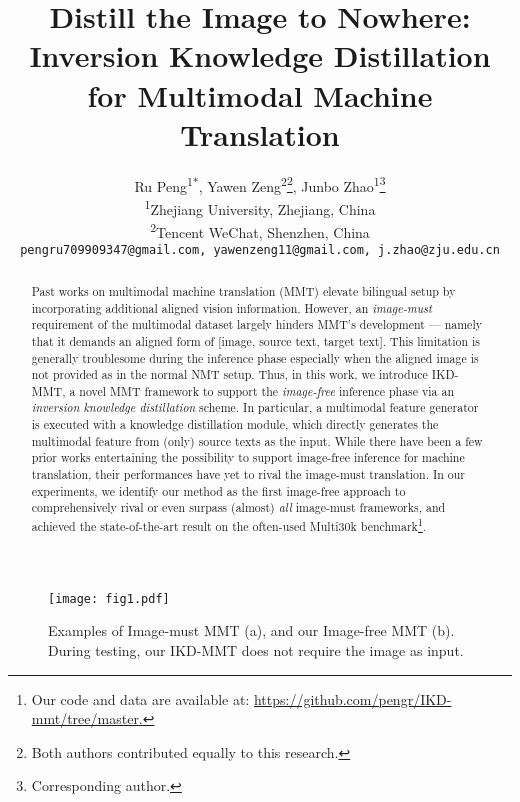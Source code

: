 \documentclass[11pt]{article}
\title{Distill the Image to Nowhere: Inversion Knowledge Distillation for Multimodal Machine Translation}
\author{Ru Peng\textsuperscript{1$\ast$}, Yawen Zeng\textsuperscript{2}\thanks{Both authors contributed equally to this research.}, Junbo Zhao\textsuperscript{1}\thanks{Corresponding author.} \\
  \textsuperscript{1}Zhejiang University, Zhejiang, China \\
  \textsuperscript{2}Tencent WeChat, Shenzhen, China \\
  \texttt{pengru709909347@gmail.com, yawenzeng11@gmail.com, j.zhao@zju.edu.cn}
}
\begin{document}
\maketitle
\begin{abstract}
Past works on multimodal machine translation (MMT) elevate bilingual setup by incorporating additional aligned vision information.
However, an \emph{image-must} requirement of the multimodal dataset largely hinders MMT's development --- namely that it demands an aligned form of [image, source text, target text].
This limitation is generally troublesome during the inference phase especially when the aligned image is not provided as in the normal NMT setup.
Thus, in this work, we introduce IKD-MMT, a novel MMT framework to support the \emph{image-free} inference phase via an \emph{inversion knowledge distillation} scheme.
In particular, a multimodal feature generator is executed with a knowledge distillation module, which directly generates the multimodal feature from (only) source texts as the input.
While there have been a few prior works entertaining the possibility to support image-free inference for machine translation, their performances have yet to rival the image-must translation.
In our experiments, we identify our method as the first image-free approach to comprehensively rival or even surpass (almost) \emph{all} image-must frameworks, and achieved the state-of-the-art result on the often-used Multi30k benchmark\footnote{Our code and data are available
at: \url{https://github.com/pengr/IKD-mmt/tree/master.}}.
\end{abstract}

\begin{figure}[!t]
\centering
{\texttt{[image: fig1.pdf]}}
\centering
\caption{Examples of Image-must MMT (a), and our Image-free MMT (b). During testing, our IKD-MMT does not require the image as input.}
\label{fig:Fig1}
\end{figure}
\end{document}
